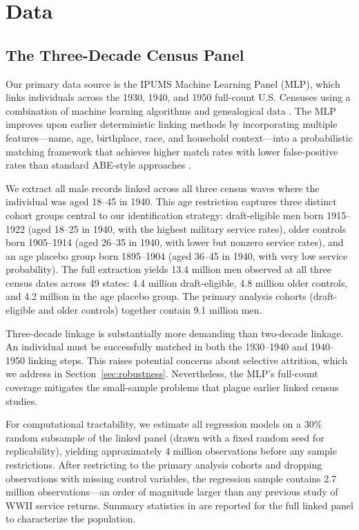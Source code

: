 \documentclass[12pt]{article}
\begin{document}
\section{Data}

\subsection{The Three-Decade Census Panel}

Our primary data source is the IPUMS Machine Learning Panel (MLP), which links individuals across the 1930, 1940, and 1950 full-count U.S. Censuses using a combination of machine learning algorithms and genealogical data \citep{price2019, ruggles2024}. The MLP improves upon earlier deterministic linking methods \citep{abramitzky2021, feigenbaum2016} by incorporating multiple features---name, age, birthplace, race, and household context---into a probabilistic matching framework that achieves higher match rates with lower false-positive rates than standard ABE-style approaches \citep{bailey2022}.

We extract all male records linked across all three census waves where the individual was aged 18--45 in 1940. This age restriction captures three distinct cohort groups central to our identification strategy: draft-eligible men born 1915--1922 (aged 18--25 in 1940, with the highest military service rates), older controls born 1905--1914 (aged 26--35 in 1940, with lower but nonzero service rates), and an age placebo group born 1895--1904 (aged 36--45 in 1940, with very low service probability). The full extraction yields 13.4 million men observed at all three census dates across 49 states: 4.4 million draft-eligible, 4.8 million older controls, and 4.2 million in the age placebo group. The primary analysis cohorts (draft-eligible and older controls) together contain 9.1 million men.

Three-decade linkage is substantially more demanding than two-decade linkage. An individual must be successfully matched in both the 1930--1940 and 1940--1950 linking steps. This raises potential concerns about selective attrition, which we address in Section~\ref{sec:robustness}. Nevertheless, the MLP's full-count coverage mitigates the small-sample problems that plague earlier linked census studies.

For computational tractability, we estimate all regression models on a 30\% random subsample of the linked panel (drawn with a fixed random seed for replicability), yielding approximately 4 million observations before any sample restrictions. After restricting to the primary analysis cohorts and dropping observations with missing control variables, the regression sample contains 2.7 million observations---an order of magnitude larger than any previous study of WWII service returns. Summary statistics in  are reported for the full linked panel to characterize the population.
\end{document}
